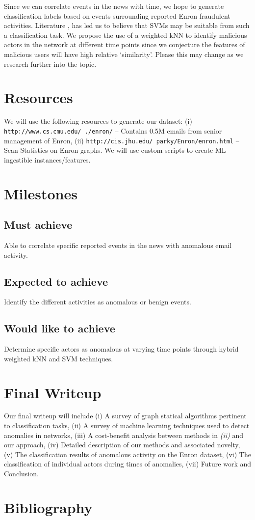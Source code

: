 \documentclass[10pt]{article}
\begin{document}
Since we can correlate events in the news with time, we hope to generate classification labels based on events
surrounding reported Enron fraudulent activities. Literature \cite{shon2007hybrid}, \cite{shon2005machine} has 
led us to believe that SVMs may be suitable from such a classification task. We propose the use of a weighted kNN to 
identify malicious actors in the network at different time points since we conjecture the features of malicious users will 
have high relative `similarity'. Please this may change as we research further into the topic.

\section{Resources}
We will use the following resources to generate our dataset: (i) \texttt{http://www.cs.cmu.edu/~./enron/} -- Contains 0.5M 
emails from senior management of Enron, (ii) \texttt{http://cis.jhu.edu/~parky/Enron/enron.html} -- Scan Statistics on
Enron graphs. We will use custom scripts to create ML-ingestible instances/features.

\section{Milestones}
\subsection{Must achieve}
Able to correlate specific reported events in the news with anomalous email activity. 
\subsection{Expected to achieve}
Identify the different activities as anomalous or benign events.
\subsection{Would like to achieve}
Determine specific actors as anomalous at varying time points through hybrid weighted kNN and SVM techniques.

\section{Final Writeup}
Our final writeup will include (i) A survey of graph statical algorithms pertinent to classification tasks, 
(ii) A survey of machine learning techniques used to detect anomalies in networks, 
(iii) A cost-benefit analysis between methods in \textit{(ii)} and our approach,
(iv) Detailed description of our methods and associated novelty,
(v) The classification results of anomalous activity on the Enron dataset,
(vi) The classification of individual actors during times of anomalies,
(vii) Future work and Conclusion.
 
\section{Bibliography}

{\small

}
\end{document}
